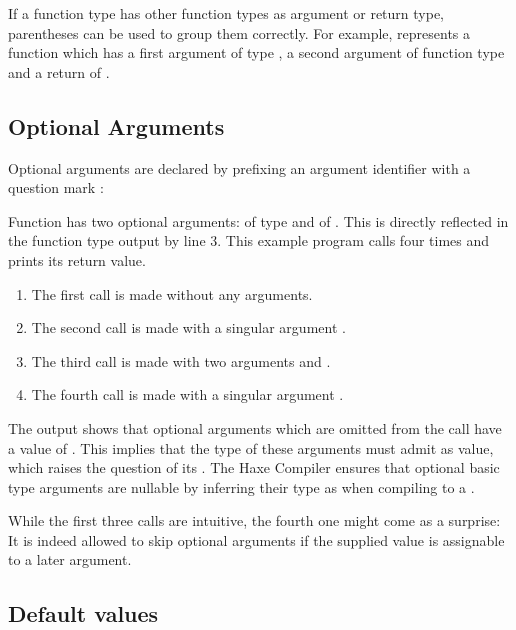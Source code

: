 If a function type has other function types as argument or return type, parentheses can be used to group them correctly. For example,  represents a function which has a first argument of type , a second argument of function type  and a return of .



\subsection{Optional Arguments}
\label{types-function-optional-arguments}

Optional arguments are declared by prefixing an argument identifier with a question mark :

Function  has two optional arguments:  of type  and  of . This is directly reflected in the function type output by line 3. 
This example program calls  four times and prints its return value.

\begin{enumerate}
	\item The first call is made without any arguments.
	\item The second call is made with a singular argument .
	\item The third call is made with two arguments  and .
	\item The fourth call is made with a singular argument .
\end{enumerate}
The output shows that optional arguments which are omitted from the call have a value of . This implies that the type of these arguments must admit  as value, which raises the question of its . The Haxe Compiler ensures that optional basic type arguments are nullable by inferring their type as  when compiling to a .

While the first three calls are intuitive, the fourth one might come as a surprise: It is indeed allowed to skip optional arguments if the supplied value is assignable to a later argument.


\subsection{Default values}
\label{types-function-default-values}


